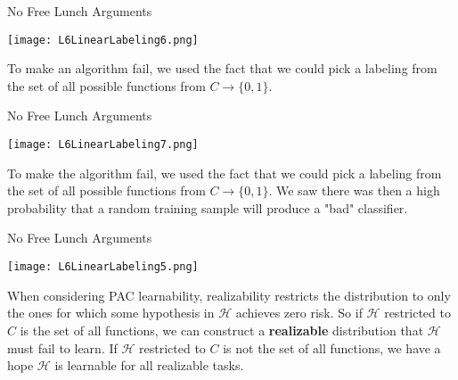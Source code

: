 \documentclass[10pt, table, dvipsnames, handout]{beamer}
\newcommand{\cH}{\ensuremath{\mathcal{H}}}
\begin{document}
\begin{frame}[fragile]{No Free Lunch Arguments}
  \begin{minipage}[t][0.6\textheight][t]{\textwidth}
	\centering \texttt{[image: L6LinearLabeling6.png]} 
  \end{minipage}
  \vfill
  \begin{minipage}[t][0.4\textheight][t]{\textwidth}
To make an algorithm fail, we used the fact that we could pick a labeling from the set of all possible functions from $C\to \{0,1\}$. 
\end{minipage}

\end{frame}



\begin{frame}[fragile]{No Free Lunch Arguments}
  \begin{minipage}[t][0.6\textheight][t]{\textwidth}
	\centering \texttt{[image: L6LinearLabeling7.png]} 
  \end{minipage}
  \vfill
  \begin{minipage}[t][0.4\textheight][t]{\textwidth}
To make the algorithm fail, we used the fact that we could pick a labeling from the set of all possible functions from $C\to \{0,1\}$. We saw there was then a high probability that a random training sample will produce a "bad" classifier. 
\end{minipage}

\end{frame}




\begin{frame}[fragile]{No Free Lunch Arguments}
  \begin{minipage}[t][0.6\textheight][t]{\textwidth}
	\centering \texttt{[image: L6LinearLabeling5.png]} 
  \end{minipage}
  \vfill
  \begin{minipage}[t][0.4\textheight][t]{\textwidth}
When considering PAC learnability, realizability restricts the distribution to only the ones for which some hypothesis in $\cH$ achieves zero risk. \pause So if $\cH$ restricted to $C$ is the set of all functions, we can construct a \textbf{realizable} distribution that $\cH$ must fail to learn. \pause If $\cH$ restricted to $C$ is not the set of all functions, we have a hope $\cH$ is learnable for all realizable tasks. 
\end{minipage}

\end{frame}
\end{document}
